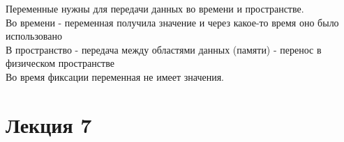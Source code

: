Переменные нужны для передачи данных во времени и пространстве.\\
Во времени - переменная получила значение и через какое-то время оно было использовано\\
В пространство - передача между областями данных (памяти) - перенос в физическом пространстве\\

Во время фиксации переменная не имеет значения.

\chapter{Лекция 7}

